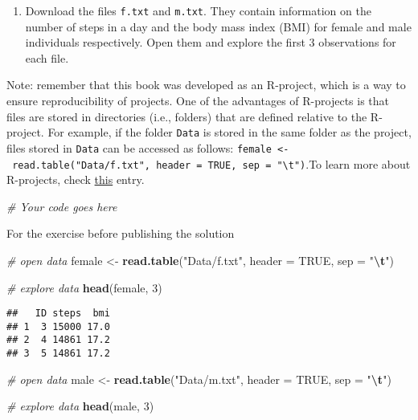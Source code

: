 \documentclass[
]{book}
\newenvironment{Shaded}{\begin{snugshade}}{\end{snugshade}}
\newcommand{\AttributeTok}[1]{\textcolor[rgb]{0.13,0.29,0.53}{#1}}
\newcommand{\CommentTok}[1]{\textcolor[rgb]{0.56,0.35,0.01}{\textit{#1}}}
\newcommand{\ConstantTok}[1]{\textcolor[rgb]{0.56,0.35,0.01}{#1}}
\newcommand{\DecValTok}[1]{\textcolor[rgb]{0.00,0.00,0.81}{#1}}
\newcommand{\FunctionTok}[1]{\textcolor[rgb]{0.13,0.29,0.53}{\textbf{#1}}}
\newcommand{\NormalTok}[1]{#1}
\newcommand{\OtherTok}[1]{\textcolor[rgb]{0.56,0.35,0.01}{#1}}
\newcommand{\SpecialCharTok}[1]{\textcolor[rgb]{0.81,0.36,0.00}{\textbf{#1}}}
\newcommand{\StringTok}[1]{\textcolor[rgb]{0.31,0.60,0.02}{#1}}
\providecommand{\tightlist}{%
  \setlength{\itemsep}{0pt}\setlength{\parskip}{0pt}}
\begin{document}
\begin{enumerate}
\def\labelenumi{\arabic{enumi}.}
\tightlist
\item
  Download the files \texttt{f.txt} and \texttt{m.txt}. They contain information on the number of steps in a day and the body mass index (BMI) for female and male individuals respectively. Open them and explore the first 3 observations for each file.
\end{enumerate}

Note: remember that this book was developed as an R-project, which is a way to ensure reproducibility of projects. One of the advantages of R-projects is that files are stored in directories (i.e., folders) that are defined relative to the R-project. For example, if the folder \texttt{Data} is stored in the same folder as the project, files stored in \texttt{Data} can be accessed as follows: \texttt{female\ \textless{}-\ read.table("Data/f.txt",\ header\ =\ TRUE,\ sep\ =\ "\textbackslash{}t")}.To learn more about R-projects, check \href{https://rfortherestofus.com/2022/10/rstudio-projects}{this} entry.

\begin{Shaded}
\begin{Highlighting}[]
\CommentTok{\# Your code goes here}
\end{Highlighting}
\end{Shaded}

{For the exercise before publishing the solution}

\begin{Shaded}
\begin{Highlighting}[]
\CommentTok{\# open data}
\NormalTok{female }\OtherTok{\textless{}{-}} \FunctionTok{read.table}\NormalTok{(}\StringTok{"Data/f.txt"}\NormalTok{, }\AttributeTok{header =} \ConstantTok{TRUE}\NormalTok{, }\AttributeTok{sep =} \StringTok{"}\SpecialCharTok{\textbackslash{}t}\StringTok{"}\NormalTok{)}

\CommentTok{\# explore data}
\FunctionTok{head}\NormalTok{(female, }\DecValTok{3}\NormalTok{)}
\end{Highlighting}
\end{Shaded}

\begin{verbatim}
##   ID steps  bmi
## 1  3 15000 17.0
## 2  4 14861 17.2
## 3  5 14861 17.2
\end{verbatim}

\begin{Shaded}
\begin{Highlighting}[]
\CommentTok{\# open data}
\NormalTok{male }\OtherTok{\textless{}{-}} \FunctionTok{read.table}\NormalTok{(}\StringTok{"Data/m.txt"}\NormalTok{, }\AttributeTok{header =} \ConstantTok{TRUE}\NormalTok{, }\AttributeTok{sep =} \StringTok{"}\SpecialCharTok{\textbackslash{}t}\StringTok{"}\NormalTok{)}

\CommentTok{\# explore data}
\FunctionTok{head}\NormalTok{(male, }\DecValTok{3}\NormalTok{)}
\end{Highlighting}
\end{Shaded}
\end{document}
